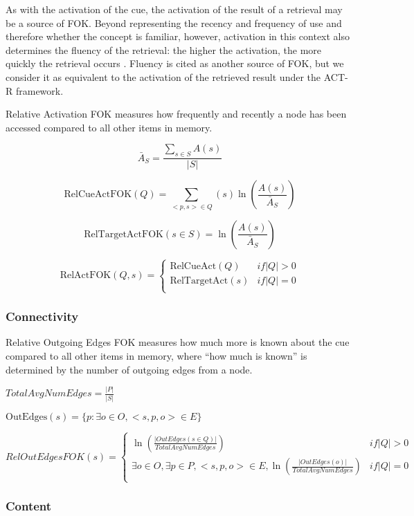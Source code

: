 \documentclass[10pt,letterpaper]{article}
\begin{document}
As with the activation of the cue, the activation of the result of a retrieval may be a source of FOK.
Beyond representing the recency and frequency of use and therefore whether the concept is familiar, however, activation in this context also determines the fluency of the retrieval: the higher the activation, the more quickly the retrieval occurs \cite{Anderson2004AnIntegratedTheory}.
Fluency is cited as another source of FOK, but we consider it as equivalent to the activation of the retrieved result under the ACT-R framework.

Relative Activation FOK measures how frequently and recently a node has been accessed compared to all other items in memory.

$$\bar{A}_S = \frac {\sum_{s{\in}S} {A(s)}}{|S|}$$

$$\text{RelCueActFOK}(Q) = \sum_{<p, s> \in Q} (s) \ln(\frac{A(s)}{\bar{A}_S})$$

$$\text{RelTargetActFOK}(s{\in}S) = \ln(\frac{A(s)}{\bar{A}_S})$$

$$\text{RelActFOK}(Q, s) =
\begin{cases}
    \text{RelCueAct}(Q) & {if |Q| > 0} \\
    \text{RelTargetAct}(s)& {if |Q| = 0} \\
\end{cases}
$$

\subsubsection{Connectivity}

Relative Outgoing Edges FOK measures how much more is known about the cue compared to all other items in memory, where “how much is known” is determined by the number of outgoing edges from a node.

$TotalAvgNumEdges = \frac{|P|}{|S|}$

$\text{OutEdges}(s) = \{p : \exists o{\in}O, <s, p, o>{\in}E \}$

$$RelOutEdgesFOK(s) =
\begin{cases}
    \ln (\frac{|OutEdges(s \in Q)|}{TotalAvgNumEdges}) & {if |Q| > 0} \\
    \exists o{\in}O, \exists p{\in}P, <s, p, o>{\in}E, \ln(\frac{|OutEdges(o)|}{TotalAvgNumEdges}) & {if |Q| = 0} \\
\end{cases}
$$

\subsubsection{Content}
\end{document}
